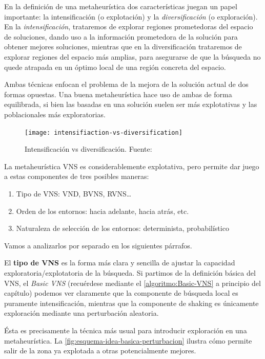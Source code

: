 En la definición de una metaheurística dos características juegan un papel importante: la intensificación (o explotación) y la \textit{diversificación} (o exploración). En la \textit{intensificación}, trataremos de explorar regiones prometedoras del espacio de soluciones, dando uso a la información prometedora de la solución para obtener mejores soluciones, mientras que en la diversificación trataremos de explorar regiones del espacio más amplias, para asegurarse de que la búsqueda no quede atrapada en un óptimo local de una región concreta del espacio.

Ambas técnicas enfocan el problema de la mejora de la solución actual de dos formas opuestas. Una buena metaheurística
hace uso de ambas de forma equilibrada, si bien las basadas en una solución suelen ser más explotativas y las poblacionales más exploratorias.

\begin{figure}
    \centering    \texttt{[image: intensifiaction-vs-diversification]}
    \caption[Intensificación vs diversificación]{Intensificación vs diversificación. Fuente:~\cite{sota:metaheuristicas-design-impl}}
    \label{fig:intensifiaction-vs-diversification}
\end{figure}

La metaheurística VNS es considerablemente explotativa, pero permite dar juego a estas componentes de tres posibles maneras:
\begin{enumerate}[label=\alph*.]
    \item Tipo de VNS: VND, BVNS, RVNS\ldots
    \item Orden de los entornos: hacia adelante, hacia atrás, etc.
    \item Naturaleza de selección de los entornos: determinista, probabilístico
\end{enumerate}

Vamos a analizarlos por separado en los siguientes párrafos.

El \textbf{tipo de VNS} es la forma más clara y sencilla de ajustar la capacidad exploratoria/explotatoria de la búsqueda. Si partimos de la definición básica del VNS, el \textit{Basic VNS} (recuérdese mediante el \autoref{algoritmo:Basic-VNS} a principio del capítulo) podemos ver claramente que la componente de búsqueda local es puramente intensificación, mientras que la componente de shaking es únicamente exploración mediante una perturbación aleatoria.

Ésta es precisamente la técnica más usual para introducir exploración en una metaheurística. La \autoref{fig:esquema-idea-basica-perturbacion} ilustra cómo permite salir de la zona ya explotada a otras potencialmente mejores.

